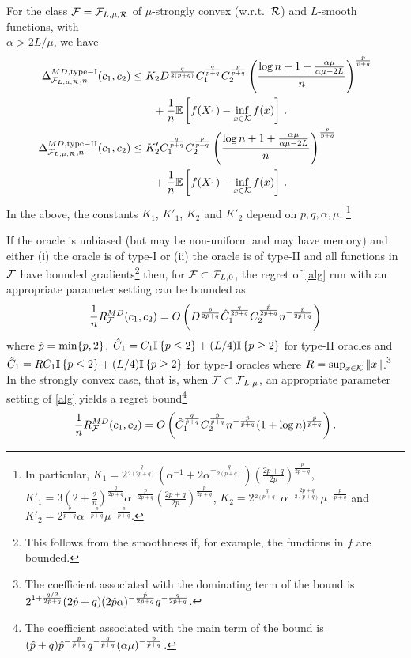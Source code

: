 \begin{theorem}
For the class $\mathcal{F}=\mathcal{F}_{L,\mu,\mathcal{R}}$ of $\mu$-strongly convex (w.r.t.\  $\mathcal{R}$) and $L$-smooth functions, with \\$\alpha >2L/\mu$, 
we have
\begin{align}
\Delta_{\F_{L,\mu,\cR},n}^{MD, \mathrm{type-I}}(c_1,c_2) 
&\leq  K_2D^{\frac{q}{2(p+q)}}C_1^{\frac{q}{p+q}}C_2^{\frac{p}{p+q}} \left( \frac{\log n+1+\frac{\alpha \mu}{\alpha \mu -2L}}{n} \right)^{\frac{p}{p+q}} \nonumber\\
&\qquad + \frac{1}{n}\EE{f(X_1)-\inf_{x \in \cK}f(x)} 
\,.
\label{eq:MDbound2TypeI}\\
\Delta_{\F_{L,\mu,\cR},n}^{MD, \mathrm{type-II}}(c_1,c_2) 
& %
\leq  K'_2C_1^{\frac{q}{p+q}}C_2^{\frac{p}{p+q}} \left( \frac{\log n+1+\frac{\alpha \mu}{\alpha \mu -2L}}{n} \right)^{\frac{p}{p+q}} \nonumber\\
&\qquad + \frac{1}{n}\EE{f(X_1)-\inf_{x \in \cK}f(x)} 
\,.
\label{eq:MDbound2}
\end{align}
In the above,
the constants $K_1$, $K'_1$, $K_2$ and $K'_2$ depend on $p, q, \alpha, \mu$.%
\footnote{
In particular,
$K_1 = 2^{\frac{q}{2(2p+q)}} \left( \alpha^{-1}+2\alpha^{-\frac{q}{2(p+q)}} \right) \left( \frac{2p+q}{2p} \right)^{\frac{p}{2p+q}}$,
$K'_1 = 3 \left(2+\frac{2}{n}\right)^{\frac{q}{2p+q} } \alpha^{-\frac{p}{2p+q}}\left(\frac{2p+q}{2p} \right)^{\frac{p}{2p+q}}$,
$K_2=2^{\frac{q}{2(p+q)}}\alpha^{-\frac{2p+q}{2(p+q)}}\mu^{-\frac{p}{p+q}}$
and
$K'_2=2^{\frac{q}{p+q}}\alpha^{-\frac{p}{p+q}}\mu^{-\frac{p}{p+q}}$.}

If the oracle is unbiased (but may be non-uniform and may have memory) and either
(i) the oracle is of type-I or (ii) the oracle is of type-II and all functions in $\mathcal{F}$ have bounded gradients\footnote{This follows from the smoothness if, for example, the functions in $f$  are bounded.} then, for $\mathcal{F} \subset \mathcal{F}_{L,0}$, the regret of \cref{alg} run with an appropriate parameter setting can be bounded as
\[
\frac{1}{n} R_{\mathcal{F}}^{MD}(c_1,c_2) = O\left( D^{\frac{\hat{p}}{2\hat{p}+q}} \hat{C}_1^{\frac{q}{2\hat{p}+q}} C_2^{\frac{\hat{p}}{2\hat{p}+q}}  n^{-\frac{\hat{p}}{2\hat{p}+q}} \right)
\]
where $\hat{p}=\min\{p,2\}$, $\hat{C}_1=C_1 \mathbb{I}\left\{p \le 2\right\} + (L/4) \mathbb{I}\left\{p \ge 2\right\}$ for type-II oracles and $\hat{C}_1=R C_1 \mathbb{I}\left\{p \le 2\right\} + (L/4) \mathbb{I}\left\{p \ge 2\right\}$ for type-I oracles where $R = \sup_{x\in\mathcal{K}} \|x\|$.\footnote{The coefficient associated with the dominating term of the bound is
$2^{1+\frac{q/2}{2\hat{p}+q}}(2\hat{p}+q) (2\hat{p} \alpha)^{-\frac{\hat{p}}{2\hat{p}+q}} q^{-\frac{q}{2\hat{p}+q}}$.} In the strongly convex case, that is, when $\mathcal{F} \subset \mathcal{F}_{L,\mu}$, an appropriate parameter setting of \cref{alg} yields a regret bound\footnote{
The coefficient associated with the main term of the bound is $(\hat{p}+q)\hat{p}^{-\frac{\hat{p}}{\hat{p}+q}} q^{-\frac{q}{\hat{p}+q}} (\alpha \mu)^{-\frac{\hat{p}}{\hat{p}+q}}$.}
\[
\frac{1}{n} R_{\mathcal{F}}^{MD}(c_1,c_2) = O\left(\hat{C}_1^{\frac{q}{\hat{p}+q}} C_2^{\frac{\hat{p}}{\hat{p}+q}} n^{-\frac{\hat{p}}{\hat{p}+q}} (1+\log n)^{\frac{\hat{p}}{\hat{p}+q}} \right).
\]
\end{theorem}
